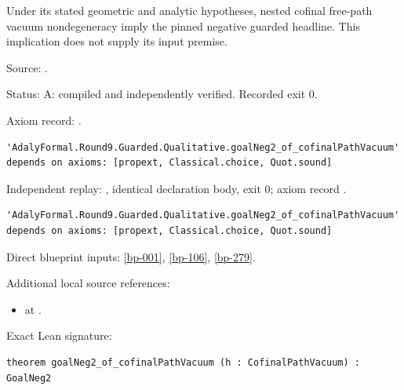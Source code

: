\begin{theorem}[bp-280]
\label{bp-280}
\leanok
Under its stated geometric and analytic hypotheses, nested cofinal free-path vacuum nondegeneracy imply the pinned negative guarded headline. This implication does not supply its input premise.

\par Source: \texttt{}.
\par Status: A: compiled and independently verified. Recorded exit 0.
\par Axiom record: \texttt{}.
\begin{verbatim}
'AdalyFormal.Round9.Guarded.Qualitative.goalNeg2_of_cofinalPathVacuum' depends on axioms: [propext, Classical.choice, Quot.sound]
\end{verbatim}
\par Independent replay: \texttt{}, identical declaration body, exit 0; axiom record \texttt{}.
\begin{verbatim}
'AdalyFormal.Round9.Guarded.Qualitative.goalNeg2_of_cofinalPathVacuum' depends on axioms: [propext, Classical.choice, Quot.sound]
\end{verbatim}
\par Direct blueprint inputs: \ref{bp-001}, \ref{bp-106}, \ref{bp-279}.
\par Additional local source references:
\begin{itemize}
\item \texttt{} at \texttt{}.
\end{itemize}
\par Exact Lean signature:
\begin{verbatim}
theorem goalNeg2_of_cofinalPathVacuum (h : CofinalPathVacuum) : GoalNeg2
\end{verbatim}
\end{theorem}

